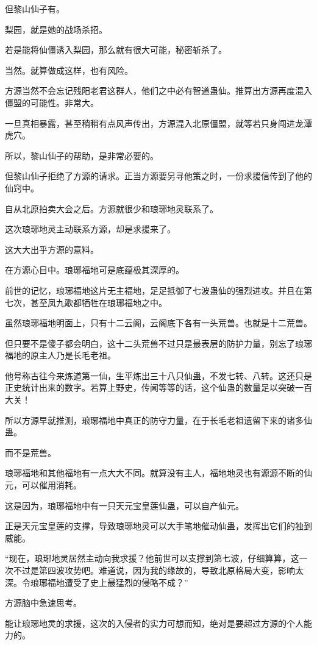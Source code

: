 \begin{this_body}
但黎山仙子有。

梨园，就是她的战场杀招。

若是能将仙僵诱入梨园，那么就有很大可能，秘密斩杀了。

当然。就算做成这样，也有风险。

方源当然不会忘记残阳老君这群人，他们之中必有智道蛊仙。推算出方源再度混入僵盟的可能性。非常大。

一旦真相暴露，甚至稍稍有点风声传出，方源混入北原僵盟，就等若只身闯进龙潭虎穴。

所以，黎山仙子的帮助，是非常必要的。

但黎山仙子拒绝了方源的请求。正当方源要另寻他策之时，一份求援信传到了他的仙窍中。

自从北原拍卖大会之后。方源就很少和琅琊地灵联系了。

这次琅琊地灵主动联系方源，却是求援来了。

这大大出乎方源的意料。

在方源心目中。琅琊福地可是底蕴极其深厚的。

前世的记忆，琅琊福地这片无主福地，足足抵御了七波蛊仙的强烈进攻。并且在第七次，甚至凤九歌都牺牲在琅琊福地之中。

虽然琅琊福地明面上，只有十二云阁，云阁底下各有一头荒兽。也就是十二荒兽。

但只要不是傻子都会明白，这十二头荒兽不过只是最表层的防护力量，别忘了琅琊福地的原主人乃是长毛老祖。

他号称古往今来炼道第一仙，生平炼出三十八只仙蛊，不发七转、八转。这还只是正史统计出来的数字。若算上野史，传闻等等的话，这个仙蛊的数量足以突破一百大关！

所以方源早就推测，琅琊福地中真正的防守力量，在于长毛老祖遗留下来的诸多仙蛊。

而不是荒兽。

琅琊福地和其他福地有一点大大不同。就算没有主人，福地地灵也有源源不断的仙元，可以催用消耗。

这是因为，琅琊福地中有一只天元宝皇莲仙蛊，可以自产仙元。

正是天元宝皇莲的支撑，导致琅琊地灵可以大手笔地催动仙蛊，发挥出它们的独到威能。

“现在，琅琊地灵居然主动向我求援？他前世可以支撑到第七波，仔细算算，这一次不过是第四波攻势吧。难道说，因为我的缘故的，导致北原格局大变，影响太深。令琅琊福地遭受了史上最猛烈的侵略不成？”

方源脑中急速思考。

能让琅琊地灵的求援，这次的入侵者的实力可想而知，绝对是要超过方源的个人能力的。


\end{this_body}
